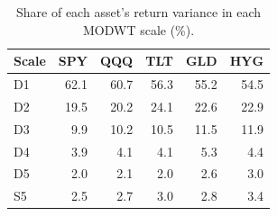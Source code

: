 \begin{table}[H]
\centering
\small
\begin{tabular}{|l|r|r|r|r|r|}
\hline
\textbf{Scale} & \textbf{SPY} & \textbf{QQQ} & \textbf{TLT} & \textbf{GLD} & \textbf{HYG} \\
\hline
D1 & 62.1 & 60.7 & 56.3 & 55.2 & 54.5 \\
D2 & 19.5 & 20.2 & 24.1 & 22.6 & 22.9 \\
D3 & 9.9 & 10.2 & 10.5 & 11.5 & 11.9 \\
D4 & 3.9 & 4.1 & 4.1 & 5.3 & 4.4 \\
D5 & 2.0 & 2.1 & 2.0 & 2.6 & 3.0 \\
S5 & 2.5 & 2.7 & 3.0 & 2.8 & 3.4 \\
\hline
\end{tabular}
\caption{Share of each asset's return variance in each MODWT scale (\%).}
\label{tab:variance_decomposition}
\end{table}
